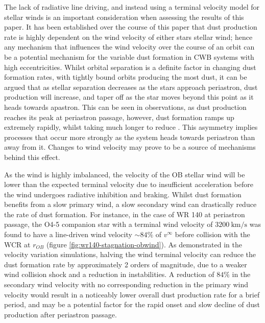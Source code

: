 The lack of radiative line driving, and instead using a terminal velocity model for stellar winds is an important consideration when assessing the results of this paper.
It has been established over the course of this paper that dust production rate is highly dependent on the wind velocity of either stars stellar wind; hence any mechanism that influences the wind velocity over the course of an orbit can be a potential mechanism for the variable dust formation in CWB systems with high eccentricities.
Whilst orbital separation is a definite factor in changing dust formation rates, with tightly bound orbits producing the most dust, it can be argued that as stellar separation decreases as the stars approach periastron, dust production will increase, and taper off as the star moves beyond this point as it heads towards apastron.
This can be seen in observations, as dust production reaches its peak at periastron passage, however, dust formation ramps up extremely rapidly, whilst taking much longer to reduce \parencite{williamsDustFormationCollidingwind2008,williams_orbitally_2009}.
This asymmetry implies processes that occur more strongly as the system heads towards periastron than away from it.
Changes to wind velocity may prove to be a source of mechanisms behind this effect.

As the wind is highly imbalanced, the velocity of the OB stellar wind will be lower than the expected terminal velocity due to insufficient acceleration before the wind undergoes radiative inhibition and braking.
Whilst dust formation benefits from a slow primary wind, a slow secondary wind can drastically reduce the rate of dust formation.
For instance, in the case of WR 140 at periastron passage, the O4-5 companion star with a terminal wind velocity of $\SI{3200}{\kilo\metre\per\second}$ was found to have a line-driven wind velocity $\sim 84\%$ of $v^\infty$ before collision with the WCR at $r_{OB}$ (figure \ref{fig:wr140-stagnation-obwind}).
As demonstrated in the velocity variation simulations, halving the wind terminal velocity can reduce the dust formation rate by approximately 2 orders of magnitude, due to a weaker wind collision shock and a reduction in instabilities.
A reduction of $84\%$ in the secondary wind velocity with no corresponding reduction in the primary wind velocity would result in a noticeably lower overall dust production rate for a brief period, and may be a potential factor for the rapid onset and slow decline of dust production after periastron passage. %


